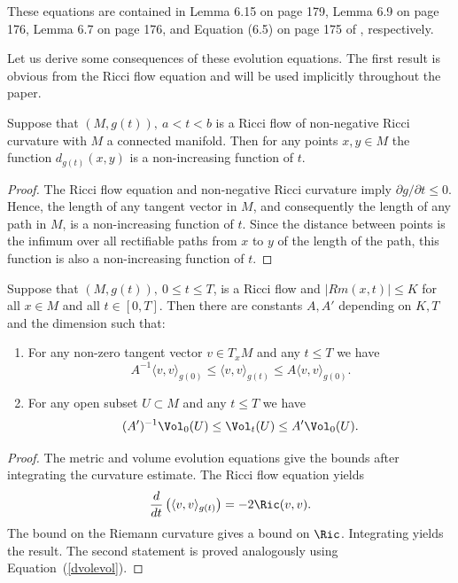 These equations are contained in Lemma 6.15  on page 179, Lemma 6.9
 on page 176,  Lemma 6.7 on page 176, and Equation (6.5) on
page 175 of \cite{ChowKnopf}, respectively.


Let us derive some consequences of these evolution equations.
The first result is obvious from the Ricci flow equation and will be used implicitly throughout
the paper.

\begin{lemma}\label{lem:distance-nonincreasing}
\label{posdistdec}

Suppose that $(M,g(t)),\ a<t<b$ is a Ricci flow of non-negative Ricci curvature
with $M$ a connected manifold.
Then for any points $x,y\in M$ the function $d_{g(t)}(x,y)$ is a non-increasing function of $t$.
\end{lemma}


\begin{proof}
\sketch The Ricci flow equation and non-negative Ricci curvature imply
$\partial g/\partial t\le 0$. Hence, the length of any tangent vector in $M$, and consequently the length
of any path in $M$, is a non-increasing function of $t$. Since the distance between points is the infimum
over all rectifiable paths from $x$ to $y$ of the length of the path, this function is also a non-increasing function
of $t$.
\end{proof}



\begin{lemma}\label{lem:metric-volume-distortion}

Suppose that $(M,g(t)),\ 0\le t\le T$, is a Ricci flow and
$|Rm(x,t)|\le K$ for all $x\in M$ and all $t\in [0,T]$. Then there
are constants $A,A'$  depending on $K,T$ and the dimension such
that:
\begin{enumerate}
\item For any non-zero tangent vector $v\in T_xM$ and any $t\le T$ we have
$$A^{-1}\langle v,v\rangle_{g(0)}\le \langle v,v\rangle_{g(t)}\le A\langle
v,v\rangle_{g(0)}.$$
\item For any open subset $U\subset M$ and any $t\le T$ we have
$$(A')^{-1}\Vol_0(U)\le \Vol_t(U)\le A'\Vol_0(U).$$
\end{enumerate}
\end{lemma}

\begin{proof}
\sketch The metric and volume evolution equations give the bounds after
integrating the curvature estimate.
The Ricci flow equation yields
$$\frac{d}{dt}\left(\langle v,v\rangle_{g(t)}\right)=-2\Ric(v,v).$$
The bound on the Riemann curvature gives a bound on $\Ric$.
Integrating yields the result. The second statement is proved
analogously using Equation~(\ref{dvolevol}).
\end{proof}




